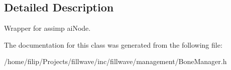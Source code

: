 \subsection{Detailed Description}
Wrapper for assimp ai\+Node. 

The documentation for this class was generated from the following file\+:\begin{DoxyCompactItemize}
\item 
/home/filip/\+Projects/fillwave/inc/fillwave/management/Bone\+Manager.\+h\end{DoxyCompactItemize}
